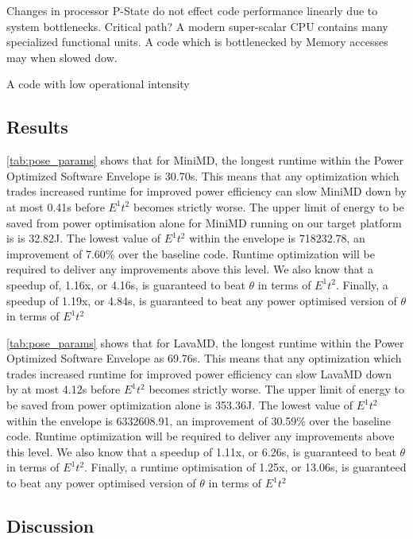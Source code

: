 Changes in processor P-State do not effect code performance linearly due to system bottlenecks. Critical path?  A modern super-scalar CPU contains many specialized functional units. A code which is bottlenecked by Memory accesses may when slowed dow.

A code with low operational intensity 


\subsection{Results}


\autoref{tab:pose_params}  shows that for MiniMD, the longest runtime within the Power Optimized Software Envelope is 30.70s.
This means that any optimization which trades increased runtime for improved power efficiency can slow MiniMD down by at most 0.41s before $E^1t^2$ becomes strictly worse.
The upper limit of energy to be saved from power optimisation alone for MiniMD running on our target platform is is 32.82J.
The lowest value of $E^1t^2$ within the envelope is 718232.78, an improvement of 7.60\% over the baseline code. 
Runtime optimization will be required to deliver any improvements above this level.
We also know that a speedup of, 1.16x, or 4.16s, is guaranteed to beat $\theta$ in terms of $E^1t^2$.
Finally, a speedup of 1.19x, or 4.84s, is guaranteed to beat any power optimised version of $\theta$ in terms of $E^1t^2$

\autoref{tab:pose_params}  shows that for LavaMD, the longest runtime within the Power Optimized Software Envelope as 69.76s.
This means that any optimization which trades increased runtime for improved power efficiency can slow LavaMD down by at most 4.12s before $E^1t^2$ becomes strictly worse.
The upper limit of energy to be saved from power optimization alone is 353.36J.
The lowest value of $E^1t^2$ within the envelope is 6332608.91, an improvement of 30.59\% over the baseline code.
Runtime optimization will be required to deliver any improvements above this level.
We also know that a speedup of 1.11x, or 6.26s, is guaranteed to beat $\theta$ in terms of $E^1t^2$.
Finally, a runtime optimisation of 1.25x, or 13.06s, is guaranteed to beat any power optimised version of $\theta$ in terms of $E^1t^2$ 

\subsection{Discussion}

